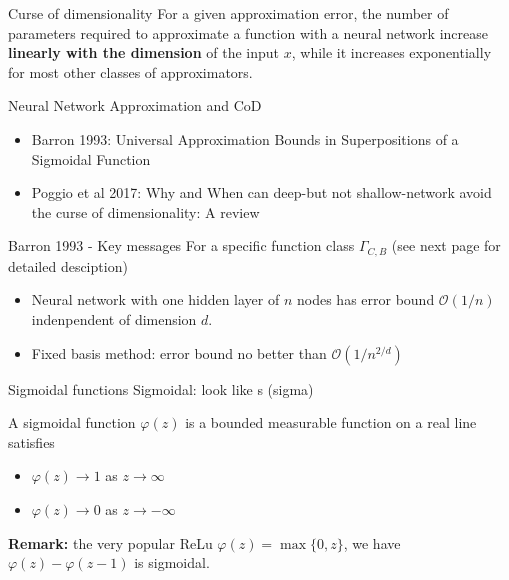 \documentclass[aspectratio=169]{beamer} %
\begin{document}
\begin{frame}{Curse of dimensionality}
For a given approximation error, the number of parameters required to approximate a function with a neural network increase \textbf{linearly with the dimension} of the input $x$, while it increases exponentially for most other classes of approximators.
    
\end{frame}
\begin{frame}{Neural Network Approximation and CoD}
\begin{itemize}
    \item Barron 1993: Universal Approximation Bounds in Superpositions of a Sigmoidal Function
    \item Poggio et al 2017: Why and When can deep-but not shallow-network avoid the curse of dimensionality: A review
\end{itemize}
    
\end{frame}
\begin{frame}{Barron 1993 - Key messages}
For a specific function class $\Gamma_{C,B}$ (see next page for detailed desciption)
\begin{itemize}
    \item Neural network with one hidden layer of $n$ nodes has error bound $\mathcal{O}(1/n)$ indenpendent of dimension $d$. 
    \item Fixed basis method: error bound no better than $\mathcal{O}(1/n^{2/d})$
\end{itemize}
\end{frame}
\begin{frame}{Sigmoidal functions}
Sigmoidal: look like s (sigma)
\begin{definition}
    A sigmoidal function $\varphi(z)$ is a bounded measurable function on a real line satisfies
    \begin{itemize}
        \item $\varphi(z)\to 1$ as $z\to \infty$
        \item $\varphi(z) \to 0$ as $z\to-\infty$
    \end{itemize}
\end{definition}
\textbf{Remark:} the very popular ReLu $\varphi(z) = \max\{0,z\}$, we have $\varphi(z)-\varphi(z-1)$ is sigmoidal.
\end{frame}
\end{document}
